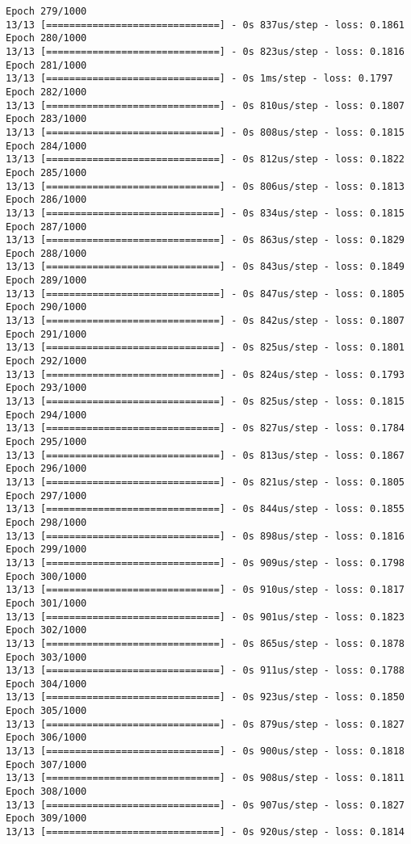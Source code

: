 \documentclass[11pt]{article}
\begin{document}
\begin{Verbatim}[commandchars=\\\{\}]
Epoch 279/1000
13/13 [==============================] - 0s 837us/step - loss: 0.1861
Epoch 280/1000
13/13 [==============================] - 0s 823us/step - loss: 0.1816
Epoch 281/1000
13/13 [==============================] - 0s 1ms/step - loss: 0.1797
Epoch 282/1000
13/13 [==============================] - 0s 810us/step - loss: 0.1807
Epoch 283/1000
13/13 [==============================] - 0s 808us/step - loss: 0.1815
Epoch 284/1000
13/13 [==============================] - 0s 812us/step - loss: 0.1822
Epoch 285/1000
13/13 [==============================] - 0s 806us/step - loss: 0.1813
Epoch 286/1000
13/13 [==============================] - 0s 834us/step - loss: 0.1815
Epoch 287/1000
13/13 [==============================] - 0s 863us/step - loss: 0.1829
Epoch 288/1000
13/13 [==============================] - 0s 843us/step - loss: 0.1849
Epoch 289/1000
13/13 [==============================] - 0s 847us/step - loss: 0.1805
Epoch 290/1000
13/13 [==============================] - 0s 842us/step - loss: 0.1807
Epoch 291/1000
13/13 [==============================] - 0s 825us/step - loss: 0.1801
Epoch 292/1000
13/13 [==============================] - 0s 824us/step - loss: 0.1793
Epoch 293/1000
13/13 [==============================] - 0s 825us/step - loss: 0.1815
Epoch 294/1000
13/13 [==============================] - 0s 827us/step - loss: 0.1784
Epoch 295/1000
13/13 [==============================] - 0s 813us/step - loss: 0.1867
Epoch 296/1000
13/13 [==============================] - 0s 821us/step - loss: 0.1805
Epoch 297/1000
13/13 [==============================] - 0s 844us/step - loss: 0.1855
Epoch 298/1000
13/13 [==============================] - 0s 898us/step - loss: 0.1816
Epoch 299/1000
13/13 [==============================] - 0s 909us/step - loss: 0.1798
Epoch 300/1000
13/13 [==============================] - 0s 910us/step - loss: 0.1817
Epoch 301/1000
13/13 [==============================] - 0s 901us/step - loss: 0.1823
Epoch 302/1000
13/13 [==============================] - 0s 865us/step - loss: 0.1878
Epoch 303/1000
13/13 [==============================] - 0s 911us/step - loss: 0.1788
Epoch 304/1000
13/13 [==============================] - 0s 923us/step - loss: 0.1850
Epoch 305/1000
13/13 [==============================] - 0s 879us/step - loss: 0.1827
Epoch 306/1000
13/13 [==============================] - 0s 900us/step - loss: 0.1818
Epoch 307/1000
13/13 [==============================] - 0s 908us/step - loss: 0.1811
Epoch 308/1000
13/13 [==============================] - 0s 907us/step - loss: 0.1827
Epoch 309/1000
13/13 [==============================] - 0s 920us/step - loss: 0.1814

\end{Verbatim}
\end{document}
